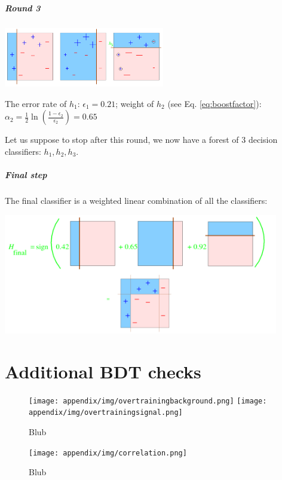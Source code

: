 \begin{appendices}
\paragraph{Round 3}

\begin{center}
\includegraphics[width=7cm]{appendix/img/adaboost4.png}
\end{center}

The error rate of $h_1$: $\epsilon_1 = 0.21$; weight of $h_2$ (see Eq. \ref{eq:boostfactor}): $\alpha_2 = \frac{1}{2} \ln\left(\frac{1-\epsilon_2}{\epsilon_2}\right) = 0.65$

Let us suppose to stop after this round, we now have a forest of 3 decision classifiers: $h_1,h_2,h_3$.

\paragraph{Final step}
The final classifier is a weighted linear combination of all the classifiers:


\begin{center}
\includegraphics[width=12cm]{appendix/img/adaboost5.png}
\end{center}

\chapter{Additional BDT checks}
\label{ch:bdtchecks}

\begin{figure}
\centering
\texttt{[image: appendix/img/overtrainingbackground.png]}
\texttt{[image: appendix/img/overtrainingsignal.png]}
\caption{Blub}
\label{fig:overtraining}
\end{figure}

\begin{figure}
\centering
\texttt{[image: appendix/img/correlation.png]}
\caption{Blub}
\label{fig:correlation}
\end{figure}

\end{appendices}